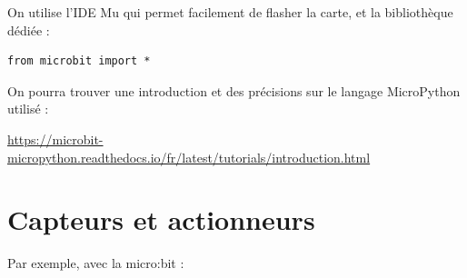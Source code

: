 On utilise l'IDE Mu qui permet facilement de flasher la carte, et la bibliothèque dédiée :

\begin{verbatim}
from microbit import *
\end{verbatim}

On pourra trouver une introduction et des précisions sur le langage MicroPython utilisé :

\href{https://microbit-micropython.readthedocs.io/fr/latest/tutorials/introduction.html}{https://microbit-micropython.readthedocs.io/fr/latest/tutorials/introduction.html}

\section{Capteurs et actionneurs}


Par exemple, avec la micro\string:bit :

